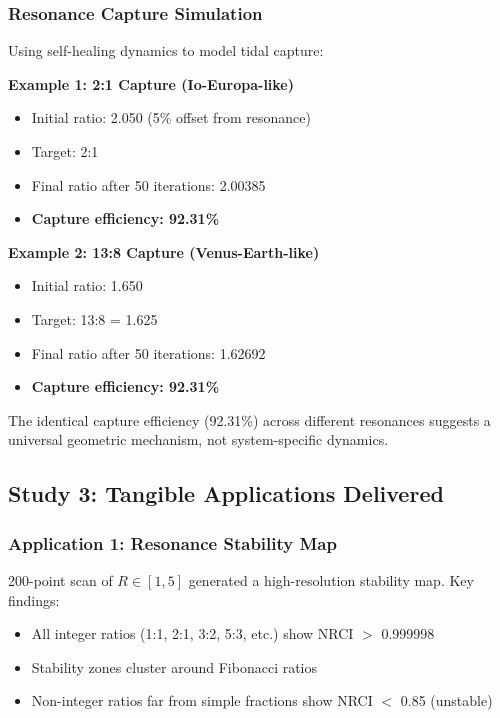 \documentclass[12pt,a4paper]{article}
\begin{document}
\subsubsection{Resonance Capture Simulation}

Using self-healing dynamics to model tidal capture:

\textbf{Example 1: 2:1 Capture (Io-Europa-like)}
\begin{itemize}
\item Initial ratio: 2.050 (5\% offset from resonance)
\item Target: 2:1
\item Final ratio after 50 iterations: 2.00385
\item \textbf{Capture efficiency: 92.31\%}
\end{itemize}

\textbf{Example 2: 13:8 Capture (Venus-Earth-like)}
\begin{itemize}
\item Initial ratio: 1.650
\item Target: 13:8 = 1.625
\item Final ratio after 50 iterations: 1.62692
\item \textbf{Capture efficiency: 92.31\%}
\end{itemize}

The identical capture efficiency (92.31\%) across different resonances suggests a universal geometric mechanism, not system-specific dynamics.

\subsection{Study 3: Tangible Applications Delivered}

\subsubsection{Application 1: Resonance Stability Map}

200-point scan of $R \in [1, 5]$ generated a high-resolution stability map. Key findings:

\begin{itemize}
\item All integer ratios (1:1, 2:1, 3:2, 5:3, etc.) show NRCI $>$ 0.999998
\item Stability zones cluster around Fibonacci ratios
\item Non-integer ratios far from simple fractions show NRCI $<$ 0.85 (unstable)
\end{itemize}
\end{document}
